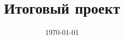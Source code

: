 \documentclass[14pt,a4paper,oneside]{extreport}
\title{Итоговый проект}
\date{\today}
\begin{document}
\renewcommand{\figurename}{Рисунок}
\renewcommand{\contentsname}{Содержание}



\tableofcontents




\end{document}
